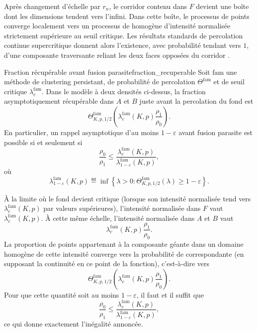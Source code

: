 \begin{Preuve}
Après changement d'échelle par $r_n$, le corridor contenu dans $F$ devient une boîte dont les dimensions tendent vers l'infini. Dans cette boîte, le processus de points converge localement vers un processus de  homogène d'intensité normalisée strictement supérieure au seuil critique. Les résultats standards de percolation continue supercritique donnent alors l'existence, avec probabilité tendant vers $1$, d'une composante traversante reliant les deux faces opposées du corridor \cite{MeesterRoy, penrose2003}.

\end{Preuve}

\begin{Theoreme}{Fraction récupérable avant fusion parasite}{fraction_recuperable}
Soit $\mathrm{fam}$ une méthode de clustering persistant, de probabilité de percolation $\Theta^{\mathrm{fam}}$ et de seuil critique $\lambda_c^{\mathrm{fam}}$. Dans le modèle à deux densités ci-dessus, la fraction asymptotiquement récupérable dans $A$ et $B$ juste avant la percolation du fond est
\[
    \Theta^{\mathrm{fam}}_{K,p,1/2}\left(
        \lambda_c^{\mathrm{fam}}(K,p)\frac{\rho_1}{\rho_0}
    \right).
\]
En particulier, un rappel asymptotique d'au moins $1-\varepsilon$ avant fusion parasite est possible si et seulement si
\[
    \frac{\rho_0}{\rho_1}
    \le
    \frac{\lambda_c^{\mathrm{fam}}(K,p)}
         {\lambda^{\mathrm{fam}}_{1-\varepsilon}(K,p)},
\]
où
\[
    \lambda^{\mathrm{fam}}_{1-\varepsilon}(K,p)
    \eqdef
    \inf\left\{\lambda>0:
    \Theta^{\mathrm{fam}}_{K,p,1/2}(\lambda)\ge 1-\varepsilon
    \right\}.
\]
\end{Theoreme}

\begin{Preuve}
À la limite où le fond devient critique (lorsque son intensité normalisée tend vers $\lambda_c^{\mathrm{fam}}(K,p)$ par valeurs supérieures), l'intensité normalisée dans $F$ vaut $\lambda_c^{\mathrm{fam}}(K,p)$. À cette même échelle, l'intensité normalisée dans $A$ et $B$ vaut
\[
    \lambda_c^{\mathrm{fam}}(K,p)\frac{\rho_1}{\rho_0}.
\]
La proportion de points appartenant à la composante géante dans un domaine homogène de cette intensité converge vers la probabilité de  correspondante (en supposant la continuité en ce point de la fonction), c'est-à-dire vers
\[
    \Theta^{\mathrm{fam}}_{K,p,1/2}\left(
        \lambda_c^{\mathrm{fam}}(K,p)\frac{\rho_1}{\rho_0}
    \right).
\]
Pour que cette quantité soit au moins $1-\varepsilon$, il faut et il suffit que
\[
    \frac{\rho_0}{\rho_1}
    \le
    \frac{\lambda_c^{\mathrm{fam}}(K,p)}
         {\lambda^{\mathrm{fam}}_{1-\varepsilon}(K,p)},
\]
ce qui donne exactement l'inégalité annoncée.
\end{Preuve}



